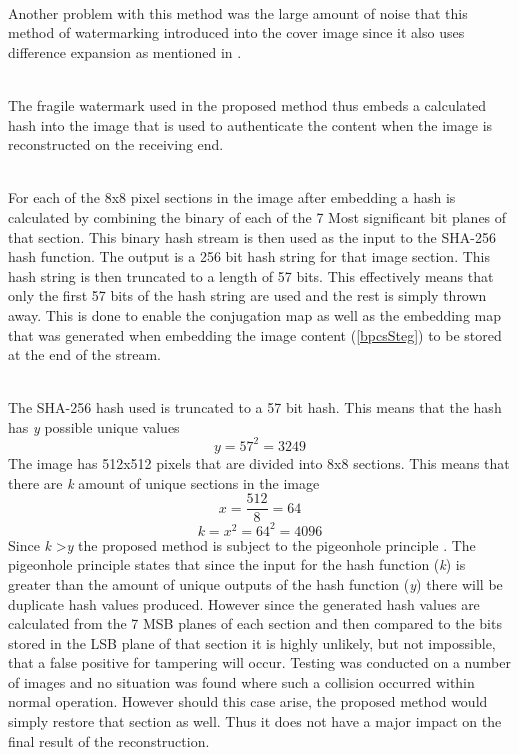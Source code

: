 \documentclass[12pt]{article}
\begin{document}
\hspace{0pt} \\
Another problem with this method was the large amount of noise that this method of watermarking introduced into the cover image since it also uses difference expansion as mentioned in \cite{tian2002reversible}.

\hspace{0pt} \\
The fragile watermark used in the proposed method thus embeds a calculated hash into the image that is used to authenticate the content when the image is reconstructed on the receiving end.

\hspace{0pt} \\
For each of the 8x8 pixel sections in the image after embedding a hash is calculated by combining the binary of each of the 7 Most significant bit planes of that section. This binary hash stream is then used as the input to the SHA-256 hash function.
The output is a 256 bit hash string for that image section.
This hash string is then truncated to a length of 57 bits.
This effectively means that only the first 57 bits of the hash string are used and the rest is simply thrown away.
This is done to enable the conjugation map as well as the embedding map that was generated when embedding the image content (\ref{bpcsSteg}) to be stored at the end of the stream.

\hspace{0pt} \\
The SHA-256 hash used is truncated to a 57 bit hash. 
This means that the hash has \textit{y} possible unique values 
\[ \textit{y} = 57^2 = 3249 \]
The image has 512x512 pixels that are divided into 8x8 sections.
This means that there are \textit{k} amount of unique sections in the image
\[\textit{x} = \frac{512}{8} = 64 \]
\[\textit{k} = \textit{x}^2 =64^2 = 4096 \]
Since \textit{k} \textgreater \textit{y} the proposed method is subject to the pigeonhole principle \cite{cook1976short}.
The pigeonhole principle states that since the input for the hash function (\textit{k}) is greater than the amount of unique outputs of the hash function (\textit{y}) there will be duplicate hash values produced.
However since the generated hash values are calculated from the 7 MSB planes of each section and then compared to the bits stored in the LSB plane of that section it is highly unlikely, but not impossible, that a false positive for tampering will occur. Testing was conducted on a number of images and no situation was found where such a collision occurred within normal operation.
However should this case arise, the proposed method would simply restore that section as well.
Thus it does not have a major impact on the final result of the reconstruction.
\end{document}
